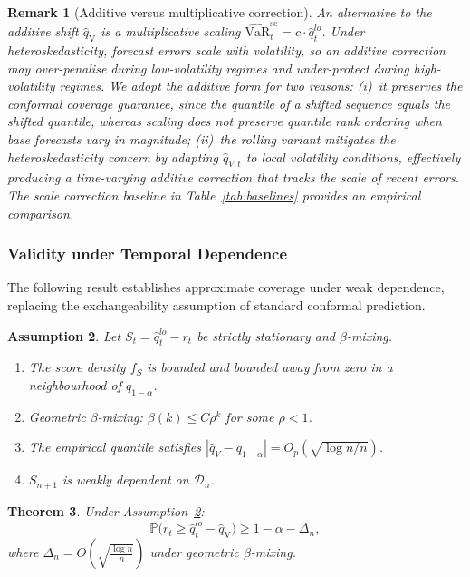 \documentclass[preprint,11pt,authoryear]{elsarticle}
\newtheorem{theorem}{Theorem}[section]
\newtheorem{remark}[theorem]{Remark}
\newtheorem{assumption}[theorem]{Assumption}
\newcommand{\VaR}{\mathrm{VaR}}
\newcommand{\1}{\boldsymbol{1}}
\newcommand{\qV}{\hat{q}_{\scriptscriptstyle\mathrm{V}}}
\begin{document}
	\begin{remark}[Additive versus multiplicative correction]
		An alternative to the additive shift $\qV$ is a
		multiplicative scaling
		$\widehat{\VaR}_t^{\mathrm{sc}} = c \cdot
		\hat{q}_t^{lo}$. Under heteroskedasticity, forecast errors
		scale with volatility, so an additive correction may
		over-penalise during low-volatility regimes and
		under-protect during high-volatility regimes. We adopt the
		additive form for two reasons: (i)~it preserves the
		conformal coverage guarantee, since the quantile of a
		shifted sequence equals the shifted quantile, whereas
		scaling does not preserve quantile rank ordering when base
		forecasts vary in magnitude; (ii)~the rolling variant
		mitigates the heteroskedasticity concern by adapting
		$\hat{q}_{V,t}$ to local volatility conditions, effectively
		producing a time-varying additive correction that tracks the
		scale of recent errors. The scale correction baseline in
		Table~\ref{tab:baselines} provides an empirical comparison.
	\end{remark}
	
	\subsubsection{Validity under Temporal Dependence}
	\label{sec:validity}
	
	The following result establishes approximate coverage under
	weak dependence, replacing the exchangeability assumption of
	standard conformal prediction.

	\begin{assumption}\label{ass:main}
		Let $S_t = \hat{q}^{lo}_t - r_t$ be strictly stationary and $\beta$-mixing.
		\begin{enumerate}[label=\textup{(A\arabic*)}]
			\item\label{ass:density} The score density $f_S$ is bounded and bounded away from zero in a neighbourhood of $q_{1-\alpha}$.
			\item\label{ass:mixing} Geometric $\beta$-mixing: $\beta(k) \leq C\rho^k$ for some $\rho < 1$.
			\item\label{ass:quantile} The empirical quantile satisfies $|\hat{q}_V - q_{1-\alpha}| = O_p(\sqrt{\log n / n})$.
			\item\label{ass:weak_dep} $S_{n+1}$ is weakly dependent on $\mathcal{D}_n$.
		\end{enumerate}
	\end{assumption}

	\begin{theorem}
		\label{thm:dependent_conformal_var}
		Under Assumption~\ref{ass:main}:
		\[
		\mathbb{P}\big(r_{t} \geq \hat{q}_t^{lo} - \qV\big)
		\ge 1 - \alpha - \Delta_n,
		\]
		where $\Delta_n = O\!\left(\sqrt{\frac{\log n}{n}}\right)$
		under geometric $\beta$-mixing.
	\end{theorem}
	
\end{document}
